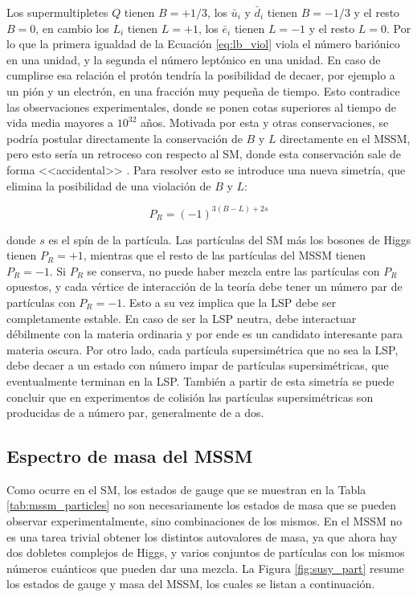 Los supermultipletes $Q$ tienen $B=+1/3$, los $\bar{u}_i$ y $\bar{d}_i$ tienen $B=-1/3$ y el resto $B=0$, en cambio los $L_i$ tienen $L=+1$, los $\bar{e}_i$ tienen $L=-1$ y el resto $L=0$. Por lo que la primera igualdad de la Ecuación \ref{eq:lb_viol} viola el número bariónico en una unidad, y la segunda el número leptónico en una unidad. En caso de cumplirse esa relación el protón tendría la posibilidad de decaer, por ejemplo a un pión y un electrón, en una fracción muy pequeña de tiempo. Esto contradice las observaciones experimentales, donde se ponen cotas superiores al tiempo de vida media mayores a $10^{32}$ años. Motivada por esta y otras conservaciones, se podría postular directamente la conservación de $B$ y $L$ directamente en el MSSM, pero esto sería un retroceso con respecto al SM, donde esta conservación sale de forma 
<<accidental>>
. Para resolver esto se introduce una nueva simetría, que elimina la posibilidad de una violación de $B$ y $L$:

\begin{equation}
	P_R = (-1)^{3(B-L)+2s}
\end{equation}

\noindent
donde $s$ es el spín de la partícula. Las partículas del SM más los bosones de Higgs tienen $P_R = +1$, mientras que el resto de las partículas del MSSM tienen $P_R = -1$. Si $P_R$ se conserva, no puede haber mezcla entre las partículas con $P_R$ opuestos, y cada vértice de interacción de la teoría debe tener un número par de partículas con $P_R=-1$. Esto a su vez implica que la LSP debe ser completamente estable. En caso de ser la LSP neutra, debe interactuar débilmente con la materia ordinaria y por ende es un candidato interesante para materia oscura. Por otro lado, cada partícula supersimétrica que no sea la LSP, debe decaer a un estado con número impar de partículas supersimétricas, que eventualmente terminan en la LSP. También a partir de esta simetría se puede concluir que en experimentos de colisión las partículas supersimétricas son producidas de a número par, generalmente de a dos.



\subsection{Espectro de masa del MSSM}

Como ocurre en el SM, los estados de gauge que se muestran en la Tabla \ref{tab:mssm_particles} no son necesariamente los estados de masa que se pueden observar experimentalmente, sino combinaciones de los mismos. En el MSSM no es una tarea trivial obtener los distintos autovalores de masa, ya que ahora hay dos dobletes complejos de Higgs, y varios conjuntos de partículas con los mismos números cuánticos que pueden dar una mezcla. La Figura \ref{fig:susy_part} resume los estados de gauge y masa del MSSM, los cuales se listan a continuación.

